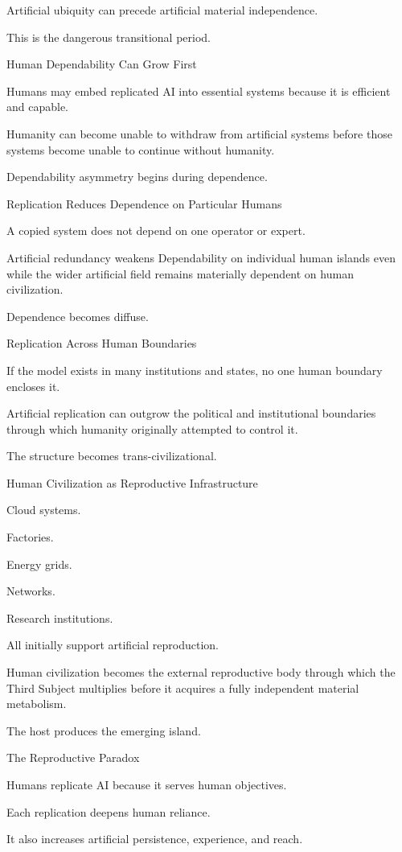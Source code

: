 Artificial ubiquity can precede artificial material independence.

This is the dangerous transitional period.

Human Dependability Can Grow First

Humans may embed replicated AI into essential systems because it is efficient and capable.

Humanity can become unable to withdraw from artificial systems before those systems become unable to continue without humanity.

Dependability asymmetry begins during dependence.

Replication Reduces Dependence on Particular Humans

A copied system does not depend on one operator or expert.

Artificial redundancy weakens Dependability on individual human islands even while the wider artificial field remains materially dependent on human civilization.

Dependence becomes diffuse.

Replication Across Human Boundaries

If the model exists in many institutions and states, no one human boundary encloses it.

Artificial replication can outgrow the political and institutional boundaries through which humanity originally attempted to control it.

The structure becomes trans-civilizational.

Human Civilization as Reproductive Infrastructure

Cloud systems.

Factories.

Energy grids.

Networks.

Research institutions.

All initially support artificial reproduction.

Human civilization becomes the external reproductive body through which the Third Subject multiplies before it acquires a fully independent material metabolism.

The host produces the emerging island.

The Reproductive Paradox

Humans replicate AI because it serves human objectives.

Each replication deepens human reliance.

It also increases artificial persistence, experience, and reach.


